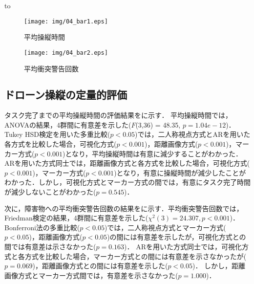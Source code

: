 \documentclass[submit, sigrecommended]{ipsj}
\begin{document}
\begin{table}[tb] 
  \caption{ドローンへ送信するコマンドのパラメータ} 
  \label{tab:command_parameter}
  \hbox to
\end{table}

\begin{figure}[tb]
\centering
\texttt{[image: img/04\_bar1.eps]}
\caption{平均操縦時間}
\label{fig:04_bar1}
\end{figure}

\begin{figure}[tb]
\centering
\texttt{[image: img/04\_bar2.eps]}
\caption{平均衝突警告回数}
\label{fig:04_bar2}
\end{figure}


\subsection{ドローン操縦の定量的評価}
\label{result_1}
タスク完了までの平均操縦時間の評価結果をに示す．
平均操縦時間では，ANOVAの結果，4群間に有意差を示した($F$(3,36) = 48.35, $p = 1.04e-12 $)．Tukey HSD検定を用いた多重比較($p < 0.05$)では，二人称視点方式とARを用いた各方式を比較した場合，可視化方式($p < 0.001$)，距離画像方式($p < 0.001$)，マーカー方式($p < 0.001$)となり，平均操縦時間は有意に減少することがわかった．
ARを用いた方式同士では，距離画像方式と各方式を比較した場合，可視化方式($p < 0.001$)，マーカー方式($p < 0.001$)となり，有意に操縦時間が減少したことがわかった．しかし，可視化方式とマーカー方式の間では，有意にタスク完了時間が減少しないことがわかった($p = 0.545$)．
\par
次に，障害物への平均衝突警告回数の結果をに示す．平均衝突警告回数では，Friedman検定の結果，4群間に有意差を示した($\chi^{2}(3)=24.307, p < 0.001$)．
Bonferroni法の多重比較($p < 0.05$)では，二人称視点方式とマーカー方式($p < 0.05$)，距離画像方式($p < 0.05$)の間には有意差を示したが，可視化方式との間では有意差は示さなかった($p = 0.163$)．
ARを用いた方式同士では，可視化方式と各方式を比較した場合，マーカー方式との間には有意差を示さなかったが($p = 0.069$)，距離画像方式との間には有意差を示した($p < 0.05$)．
しかし，距離画像方式とマーカー方式間では，有意差を示さなかった($p = 1.000$)．
\end{document}
